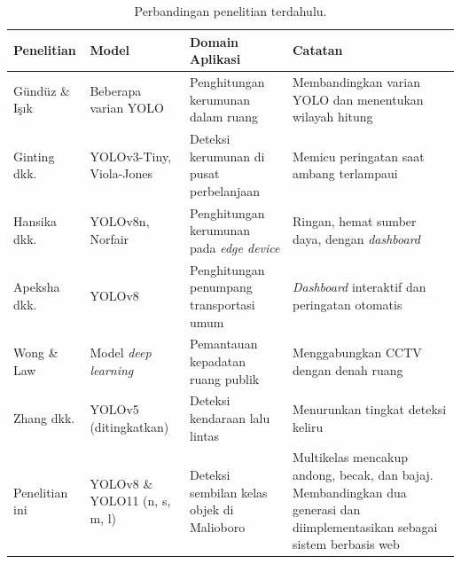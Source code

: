 \begin{table}[h]
    \centering
    \caption{Perbandingan penelitian terdahulu.}
    \begin{tabular}{|p{2.4cm}|p{2.6cm}|p{3.0cm}|p{3.6cm}|}
        \hline
        \textbf{Penelitian} & \textbf{Model} & \textbf{Domain Aplikasi} & \textbf{Catatan} \\
        \hline \hline
        Gündüz \& Işık \cite{gunduz2023new} & Beberapa varian YOLO & Penghitungan kerumunan dalam ruang & Membandingkan varian YOLO dan menentukan wilayah hitung \\
        \hline
        Ginting dkk. \cite{ginting2021crowd} & YOLOv3-Tiny, Viola-Jones & Deteksi kerumunan di pusat perbelanjaan & Memicu peringatan saat ambang terlampaui \\
        \hline
        Hansika dkk. \cite{hansika2024privacy} & YOLOv8n, Norfair & Penghitungan kerumunan pada \textit{edge device} & Ringan, hemat sumber daya, dengan \textit{dashboard} \\
        \hline
        Apeksha dkk. \cite{apeksha2025transit} & YOLOv8 & Penghitungan penumpang transportasi umum & \textit{Dashboard} interaktif dan peringatan otomatis \\
        \hline
        Wong \& Law \cite{wong2024fusion} & Model \textit{deep learning} & Pemantauan kepadatan ruang publik & Menggabungkan CCTV dengan denah ruang \\
        \hline
        Zhang dkk. \cite{zhang2022realtime} & YOLOv5 (ditingkatkan) & Deteksi kendaraan lalu lintas & Menurunkan tingkat deteksi keliru \\
        \hline
        Penelitian ini & YOLOv8 \& YOLO11 (n, s, m, l) & Deteksi sembilan kelas objek di Malioboro & Multikelas mencakup andong, becak, dan bajaj. Membandingkan dua generasi dan diimplementasikan sebagai sistem berbasis web \\
        \hline
    \end{tabular}
    \label{tab:tinjauan}
\end{table}

